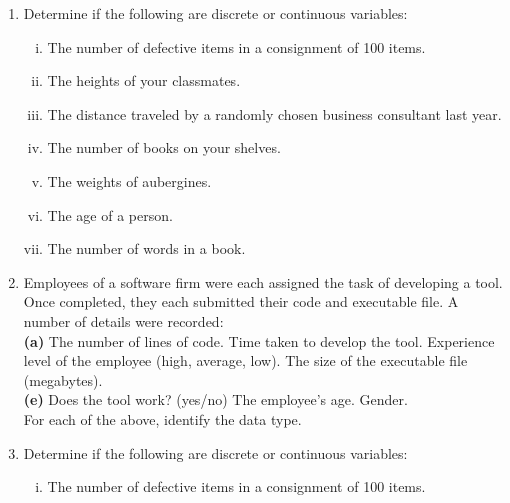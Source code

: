 \documentclass[]{report}
\begin{document}
\begin{enumerate}
\item Determine if the following are discrete or continuous variables:

\begin{enumerate}[(i)]
\item 
The number of defective items in a consignment of 100 items.

\item 
The heights of your classmates.

\item The distance traveled by a randomly chosen business consultant last year.

\item 

The number of books on your shelves.
\item 
The weights of aubergines.


\item 

The age of a person.

\item The number of words in a book.

\end{enumerate}



\item 
Employees of a software firm were each assigned the task of developing a tool. Once completed, they each submitted their code and executable file. A number of details were recorded:\\[-0.2cm]

{\bf(a)} The number of lines of code. Time taken to develop the tool.  Experience level of the employee (high, average, low).  The size of the executable file (megabytes).\quad \\ {\bf(e)} Does the tool work? (yes/no)   The employee's age. Gender.\\[-0.2cm]

For each of the above, identify the data type.

\item Determine if the following are discrete or continuous variables:

\begin{enumerate}[(i)]
\item 
The number of defective items in a consignment of 100 items.


\end{enumerate}
\end{enumerate}
\end{document}

